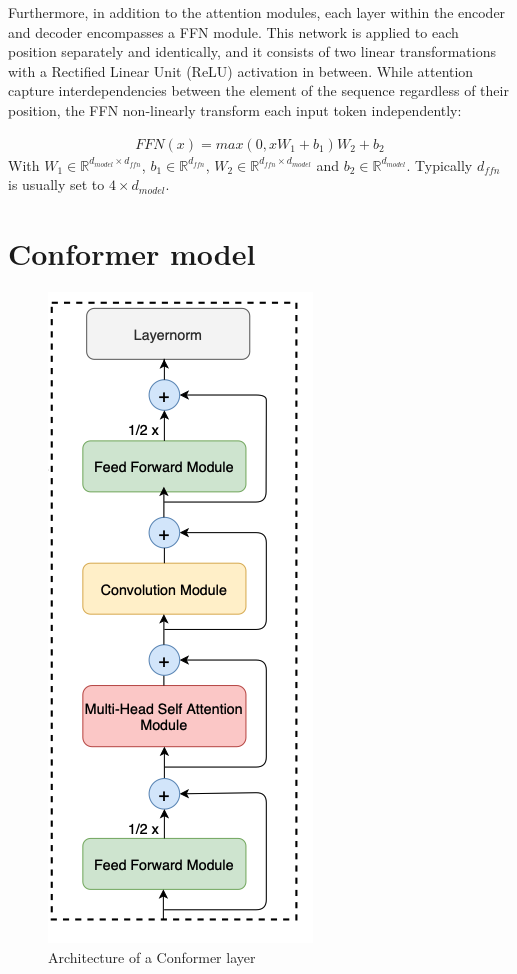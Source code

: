 Furthermore, in addition to the attention modules, each layer within the encoder and decoder encompasses a FFN module. This network is applied to each position separately and identically, and it consists of two linear transformations with a Rectified Linear Unit (ReLU) activation in between. While attention capture interdependencies between the element of the sequence regardless of their position, the FFN non-linearly transform each input token independently:

\begin{align}
    FFN(x) = max(0,xW_1 + b_1)W_2 + b_2
\end{align}
With $W_1 \in \mathbb{R}^{d_{model} \times d_{ffn}}$, $b_1 \in \mathbb{R}^{d_{ffn}}$, $W_2 \in \mathbb{R}^{d_{ffn} \times d_{model}}$ and $b_2 \in \mathbb{R}^{d_{model}}$. Typically $d_{ffn}$ is usually set to $4 \times d_{model}$.

\section{Conformer model}
\label{sec:conformer}
\begin{figure}[h]
    \centering
    \includegraphics[scale=0.4]{imgs/ConformerLayer.png}
    \caption{Architecture of a Conformer layer}
    \label{fig:conformer_archi}
\end{figure}

